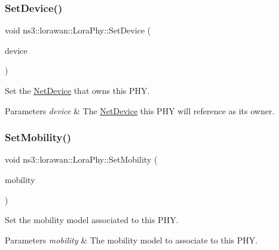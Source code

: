 \subsubsection{\texorpdfstring{Set\+Device()}{SetDevice()}}
{\footnotesize\ttfamily void ns3\+::lorawan\+::\+Lora\+Phy\+::\+Set\+Device (\begin{DoxyParamCaption}\item[{Ptr$<$ \hyperlink{classNetDevice}{Net\+Device} $>$}]{device }\end{DoxyParamCaption})}

Set the \hyperlink{classNetDevice}{Net\+Device} that owns this P\+HY.


\begin{DoxyParams}{Parameters}
{\em device} & The \hyperlink{classNetDevice}{Net\+Device} this P\+HY will reference as its owner. \\
\hline
\end{DoxyParams}
\mbox{\label{classns3_1_1lorawan_1_1LoraPhy_a72179baf58ace833ad19f2f32e8d8635}} 
\subsubsection{\texorpdfstring{Set\+Mobility()}{SetMobility()}}
{\footnotesize\ttfamily void ns3\+::lorawan\+::\+Lora\+Phy\+::\+Set\+Mobility (\begin{DoxyParamCaption}\item[{Ptr$<$ Mobility\+Model $>$}]{mobility }\end{DoxyParamCaption})}

Set the mobility model associated to this P\+HY.


\begin{DoxyParams}{Parameters}
{\em mobility} & The mobility model to associate to this P\+HY. \\
\hline
\end{DoxyParams}
\mbox{\label{classns3_1_1lorawan_1_1LoraPhy_a728d263724c20bb591247a4cb5b2641a}} 
